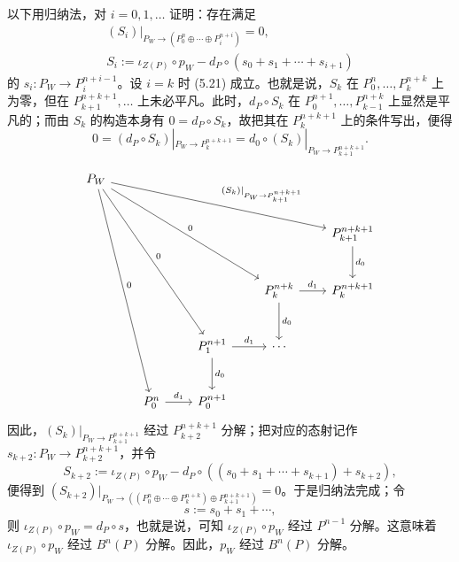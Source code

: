 以下用归纳法，对 $i=0,1,\ldots$ 证明：存在满足
\begin{equation}
\begin{gathered}
  (S_i)|_{P_W\to(P_0^n\oplus\cdots\oplus P_i^{n+i})}=0,\\
  S_i:=\iota_{Z(P)}\circ p_W-d_P\circ(s_0+s_1+\cdots+s_{i+1})
\end{gathered} \tag{5.21}
\end{equation}
的 $s_i\colon P_W\to P_i^{n+i-1}$。设 $i=k$ 时 (5.21) 成立。也就是说，$S_k$ 在 $P_0^n,\ldots,P_k^{n+k}$ 上为零，但在 $P_{k+1}^{n+k+1},\ldots$ 上未必平凡。此时，$d_P\circ S_k$ 在 $P_0^{n+1},\ldots,P_{k-1}^{n+k}$ 上显然是平凡的；而由 $S_k$ 的构造本身有 $0=d_P\circ S_k$，故把其在 $P_k^{n+k+1}$ 上的条件写出，便得
\[
  0=(d_P\circ S_k)|_{P_W\to P_k^{n+k+1}}=d_0\circ(S_k)|_{P_W\to P_{k+1}^{n+k+1}}.
\]


\[\begin{tikzcd}[row sep=2.6em, column sep=2.2em]
P_W \arrow[drrrr,"(S_k)|_{P_W\to P_{k+1}^{n+k+1}}"] \arrow[ddrrr,"0"] \arrow[dddrr,"0"] \arrow[ddddr,"0"] & & & & \\
& & & & P_{k+1}^{n+k+1} \arrow[d,"d_0"]\\
& & & P_k^{n+k} \arrow[r,"d_1"] \arrow[d,"d_0"] & P_k^{n+k+1}\\
& & P_1^{n+1} \arrow[r,"d_1"] \arrow[d,"d_0"] & \cdots & \\
& P_0^n \arrow[r,"d_1"] & P_0^{n+1} & &
\end{tikzcd}\]
因此，$(S_k)|_{P_W\to P_{k+1}^{n+k+1}}$ 经过 $P_{k+2}^{n+k+1}$ 分解；把对应的态射记作 $s_{k+2}\colon P_W\to P_{k+2}^{n+k+1}$，并令
\[
  S_{k+2}:=\iota_{Z(P)}\circ p_W-d_P\circ((s_0+s_1+\cdots+s_{k+1})+s_{k+2}),
\]
便得到 $(S_{k+2})|_{P_W\to((P_0^n\oplus\cdots\oplus P_k^{n+k})\oplus P_{k+1}^{n+k+1})}=0$。于是归纳法完成；令
\[
  s:=s_0+s_1+\cdots,
\]
则 $\iota_{Z(P)}\circ p_W=d_P\circ s$，也就是说，可知 $\iota_{Z(P)}\circ p_W$ 经过 $P^{n-1}$ 分解。这意味着 $\iota_{Z(P)}\circ p_W$ 经过 $B^n(P)$ 分解。因此，$p_W$ 经过 $B^n(P)$ 分解。


